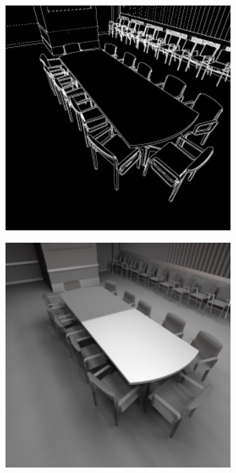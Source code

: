 \begin{figure}[htb]
\begin{subfigure}[b]{0.33\textwidth}
    \caption{}
    \label{fig:concept:interleaved_segovia_4}
  \end{subfigure}%
  \begin{subfigure}[b]{0.33\textwidth}
    \centering
    \includegraphics[width=0.95\textwidth]{graphics/interleaved_segovia_5}
    \caption{}
    \label{fig:concept:interleaved_segovia_5}
  \end{subfigure}%
  \begin{subfigure}[b]{0.33\textwidth}
    \centering
    \includegraphics[width=0.95\textwidth]{graphics/interleaved_segovia_6}

\end{subfigure}
\end{figure}

